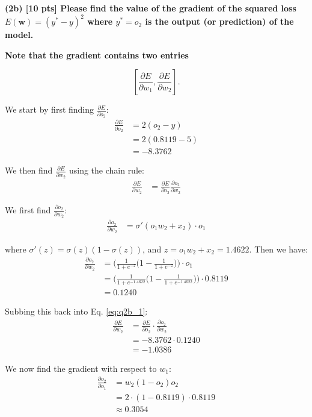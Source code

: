 \textbf{(2b) [10 pts] Please find the value of the gradient of the squared loss \( E(\mathbf{w}) = (y^* - y)^2 \) where \( y^* = o_2 \) is the output (or prediction) of the model.}

\textbf{Note that the gradient contains two entries}

\[
\left[ \frac{\partial E}{\partial w_1}, \frac{\partial E}{\partial w_2} \right].
\]


We start by first finding $\frac{\partial E}{\partial o_2}$:
\begin{align}
    \frac{\partial E}{\partial o_2} &= 2(o_2 - y) \nonumber \\
    &= 2(0.8119 - 5) \nonumber \\
    &= -8.3762
\end{align}

We then find $\frac{\partial E}{\partial w_2}$ using the chain rule:
\begin{align}
  \frac{\partial E}{\partial w_2} &= \frac{\partial E}{\partial o_2} \frac{\partial o_2}{\partial w_2} \label{eq:q2b_1}
\end{align}

We first find $\frac{\partial o_2}{\partial w_2}$:
\begin{align}
  \frac{\partial o_2}{\partial w_2} &= \sigma'(o_1 w_2 + x_2)\cdot o_1
\end{align}

where $\sigma'(z)=\sigma(z)(1-\sigma(z))$, and $z=o_1 w_2 + x_2 = 1.4622$. Then we have:
\begin{align}
  \frac{\partial o_2}{\partial w_2} &= \Bigg(\frac{1}{1+e^{-z}}\Big(1-\frac{1}{1+e^{-z}} \Big)\Bigg) \cdot o_1 \nonumber \\
  &= \Bigg(\frac{1}{1+e^{-1.4622}}\Big(1-\frac{1}{1+e^{-1.4622}} \Big)\Bigg) \cdot 0.8119 \nonumber \\
  &= 0.1240
\end{align}

Subbing this back into Eq. \ref{eq:q2b_1}:
\begin{align}
  \frac{\partial E}{\partial w_2} &= \frac{\partial E}{\partial o_2} \cdot \frac{\partial o_2}{\partial w_2} \nonumber \\
  &= -8.3762 \cdot 0.1240 \nonumber \\
  &= -1.0386
\end{align}


We now find the gradient with respect to $w_1$:
\begin{align}
    \frac{\partial o_2}{\partial o_1} &= w_2 (1 - o_2) o_2 \nonumber \\
    &= 2 \cdot (1 - 0.8119) \cdot 0.8119 \nonumber \\
    &\approx 0.3054
\end{align}

